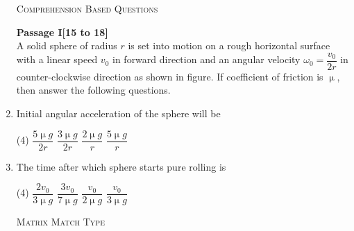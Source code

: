 \documentclass[11pt]{article}
\begin{document}
\begin{enumerate}
   \begin{center}
    \textsc{Comprehension Based Questions}
    \end{center}
{\textbf{Passage I[15 to 18]}}\\
A solid sphere of radius $r$ is set into motion on a rough horizontal surface with a linear speed $v_0$ in forward direction and an angular velocity $\omega_0=\dfrac{v_0}{2r}$ in counter-clockwise direction as shown in figure. If coefficient of friction is $\upmu$, then answer the following questions.
\begin{center}
    \end{center}

    \item Initial angular acceleration of the sphere will be
    \begin{tasks}(4)
        \task $\dfrac{5\upmu g}{2r}$\ans
        \task $\dfrac{3\upmu g}{2r}$
        \task $\dfrac{2\upmu g}{r}$
        \task $\dfrac{5\upmu g}{r}$
    \end{tasks}

    \item The time after which sphere starts pure rolling is
    \begin{tasks}(4)
        \task $\dfrac{2v_0}{3\upmu g}$
        \task $\dfrac{3v_0}{7\upmu g}$\ans
        \task $\dfrac{v_0}{2\upmu g}$
        \task $\dfrac{v_0}{3\upmu g}$
    \end{tasks}


    \begin{center}
        \textsc{Matrix Match Type}
    \end{center}

   
    

\end{enumerate}





% 

\end{document}
